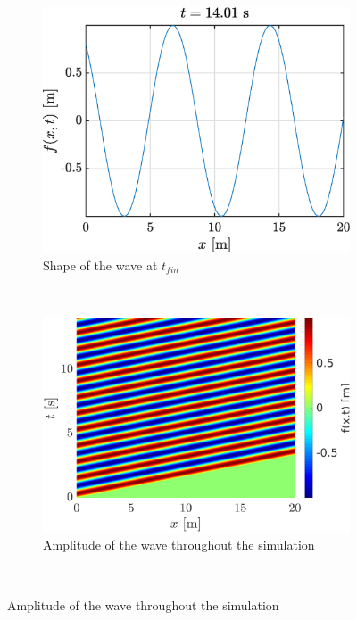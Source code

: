 \documentclass[a4paper,12pt,twoside]{article}
\begin{document}
    \begin{figure}[h!]
    \begin{subfigure}{0.5\textwidth}
    \includegraphics[width=\textwidth]{graphs/ex1fsortie.eps}
    \caption{Shape of the wave at $t_{fin}$}
    \label{fig:ex1sorf}
    \end{subfigure}
    ~
    \begin{subfigure}{0.55\textwidth}
    \includegraphics[width=\textwidth]{graphs/ex1xtsortie.eps}
    \caption{Amplitude of the wave throughout the simulation}
    \label{fig:ex1sorxt}
    \end{subfigure}\


\end{figure}
\end{document}
